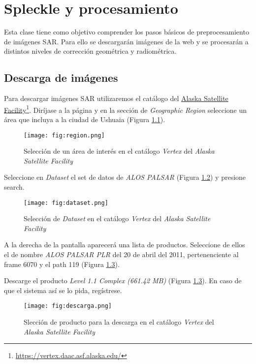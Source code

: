 \chapter{Spleckle y procesamiento}

Esta clase tiene como objetivo comprender los pasos básicos de preprocesamiento de imágenes SAR. Para ello se descargarán imágenes de la web y se procesarán a distintos niveles de corrección geométrica y radiométrica.

\section{Descarga de imágenes}

Para descargar imágenes SAR utilizaremos el catálogo del \href{https://vertex.daac.asf.alaska.edu/}{Alaska Satellite Facility}\footnote{\href{https://vertex.daac.asf.alaska.edu/}{https://vertex.daac.asf.alaska.edu/}}. Diríjase a la página y en la sección de \emph{Geographic Region} seleccione un área que incluya a la ciudad de Ushuaia (Figura \ref{fig:region}).

\begin{figure}[h!]
    \centering
    \texttt{[image: fig:region.png]}
    \caption{Selección de un área de interés en el catálogo \emph{Vertex} del \emph{Alaska Satellite Facility}}
    \label{fig:region}
\end{figure}

Seleccione en \emph{Dataset} el set de datos de \emph{ALOS PALSAR} (Figura \ref{fig:dataset}) y presione search.

\begin{figure}[h!]
    \centering
    \texttt{[image: fig:dataset.png]}
    \caption{Selección de \emph{Dataset} en el catálogo \emph{Vertex} del \emph{Alaska Satellite Facility}}
    \label{fig:dataset}
\end{figure}

A la derecha de la pantalla aparecerá una lista de productos. Seleccione de ellos el de nombre \emph{ALOS PALSAR PLR} del 20 de abril del 2011, pertenenciente al frame 6070 y el path 119 (Figura \ref{fig:descarga}).

Descarge el producto \emph{Level 1.1 Complex (661.42 MB)} (Figura \ref{fig:descarga}). En caso de que el sistema así se lo pida, regístrese.

\begin{figure}[h!]
    \centering
    \texttt{[image: fig:descarga.png]}
    \caption{Slección de producto para la descarga en el catálogo \emph{Vertex} del \emph{Alaska Satellite Facility}}
    \label{fig:descarga}
\end{figure}

